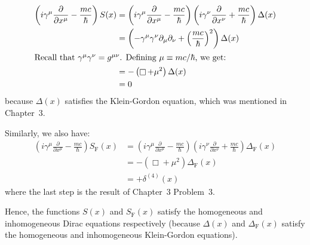 \documentclass[letterpaper,12pt]{article}
\newenvironment{problem}{\subsection{}\begin{adjustwidth}{0.25in}{}\vspace{-\baselineskip}}{\end{adjustwidth}}
\newcommand{\pder}[2]{\frac{\partial #1}{\partial #2}}
\DeclareMathOperator{\dalem}{\Box}
\newcommand{\define}{\equiv}
\begin{document}
\begin{problem}
\begin{align*}
	\left(i\gamma^\mu\pder{}{x^\mu} - \frac{mc}{\hbar}\right) S(x)
	&= \left(i\gamma^\mu\pder{}{x^\mu} - \frac{mc}{\hbar}\right) \left(i\gamma^\nu\pder{}{x^\nu} + \frac{mc}{\hbar}\right) \Delta(x)	\\
	&= \left(-\gamma^\mu \gamma^\nu \partial_\mu \partial_\nu  + \left(\frac{mc}{\hbar}\right)^2\right) \Delta(x)	\\
\intertext{Recall that $\gamma^\mu\gamma^\nu = g^{\mu\nu}$. Defining $\mu\define mc/\hbar$, we get:}
	&= -\left(\dalem + \mu^2 \right)\Delta(x)	\\
	&= 0 
\end{align*}
because $\Delta(x)$ satisfies the Klein-Gordon equation, which was mentioned in Chapter~3.

Similarly, we also have:
\begin{align*}
	\left(i\gamma^\mu\pder{}{x^\mu} - \frac{mc}{\hbar}\right) S_\text{F}(x)
	&= \left(i\gamma^\mu\pder{}{x^\mu} - \frac{mc}{\hbar}\right) \left(i\gamma^\nu\pder{}{x^\nu} + \frac{mc}{\hbar}\right) \Delta_\text{F}(x)	\\
	&= -\left(\dalem + \mu^2 \right)\Delta_\text{F}(x)	\\
	&= +\delta^{(4)}(x)
\end{align*}
where the last step is the result of Chapter~3 Problem~3.

Hence, the functions $S(x)$ and $S_\text{F}(x)$ satisfy the homogeneous and inhomogeneous Dirac equations respectively (because $\Delta(x)$ and $\Delta_\text{F}(x)$ satisfy the homogeneous and inhomogeneous Klein-Gordon equations).
\end{problem}
\end{document}
